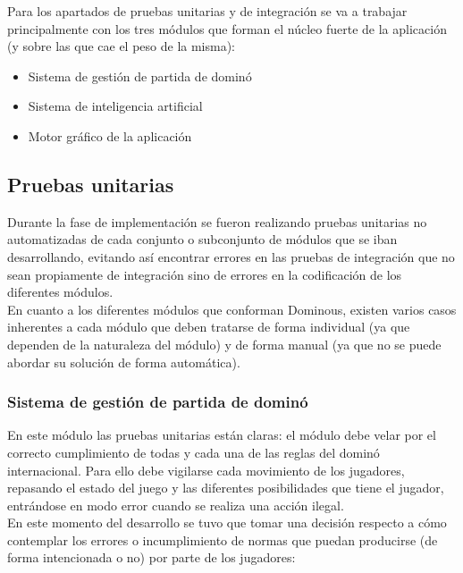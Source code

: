 Para los apartados de pruebas unitarias y de integración se va a trabajar principalmente con los tres módulos que
forman el núcleo fuerte de la aplicación (y sobre las que cae el peso de la misma):

\begin{itemize}
    \item Sistema de gestión de partida de dominó
    \item Sistema de inteligencia artificial
    \item Motor gráfico de la aplicación
\end{itemize}

\subsection{Pruebas unitarias}

Durante la fase de implementación se fueron realizando pruebas unitarias no automatizadas de cada conjunto o subconjunto
de módulos que se iban desarrollando, evitando así encontrar errores en las pruebas de integración que no sean propiamente
de integración sino de errores en la codificación de los diferentes módulos. \\

En cuanto a los diferentes módulos que conforman Dominous, existen varios casos inherentes a cada módulo que deben
tratarse de forma individual (ya que dependen de la naturaleza del módulo) y de forma manual (ya que no se puede abordar su
solución de forma automática).

\subsubsection{Sistema de gestión de partida de dominó}

En este módulo las pruebas unitarias están claras: el módulo debe velar por el correcto cumplimiento de todas y cada
una de las reglas del dominó internacional. Para ello debe vigilarse cada movimiento de los jugadores, repasando
el estado del juego y las diferentes posibilidades que tiene el jugador, entrándose en modo error cuando se realiza
una acción ilegal. \\

En este momento del desarrollo se tuvo que tomar una decisión respecto a cómo contemplar los errores o incumplimiento de
normas que puedan producirse (de forma intencionada o no) por parte de los jugadores:

